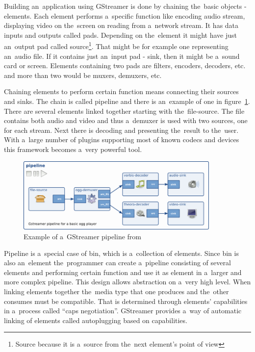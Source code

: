Building an~application using GStreamer is done by chaining the~basic objects - elements. Each element performs a~specific function like encoding audio stream, displaying video on the~screen on reading from a~network stream. It has data inputs and outputs called pads. Depending on the~element it might have just an~output pad called source\footnote{Source because it is a~source from the~next element's point of view}. That might be for example one representing an~audio file. If it contains just an~input pad - sink, then it might be a~sound card or screen. Elements containing two pads are filters, encoders, decoders, etc. and more than two would be muxers, demuxers, etc.

Chaining elements to perform certain function means connecting their sources and sinks. The chain is called pipeline and there is an~example of one in figure~\ref{fig:gstreamerPipeline}. There are several elements linked together starting with the~file-source. The file contains both audio and video and thus a~demuxer is used with two sources, one for each stream. Next there is decoding and presenting the~result to the~user. With a~large number of plugins supporting most of known codecs and devices this framework becomes a~very powerful tool. 

\begin{figure}[ht]
	\begin{center}
	\includegraphics[width=10cm]{fig/gstreamer-pipeline.png}
	\caption{Example of a~GStreamer pipeline from~\cite{gstreamer}}
	\label{fig:gstreamerPipeline}
\end{center}
\end{figure}

Pipeline is a~special case of bin, which is a~collection of elements. Since bin is also an~element the~programmer can create a~pipeline consisting of several elements and performing certain function and use it as element in a~larger and more complex pipeline. This design allows abstraction on a~very high level. When linking elements together the~media type that one produces and the~other consumes must be compatible. That is determined through elements' capabilities in a~process called ``caps negotiation''. GStreamer provides a~way of automatic linking of elements called autoplugging based on capabilities. 

